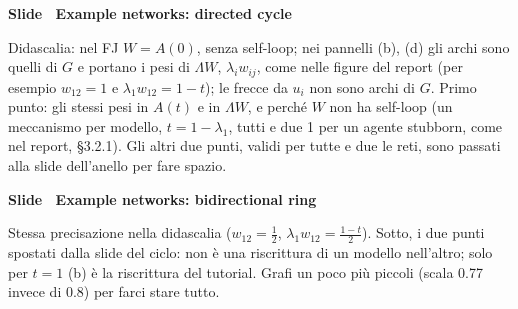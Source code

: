 \par\addvspace{14pt}\noindent\begin{minipage}{\textwidth}
{\color{unipd}\bfseries Slide  \textperiodcentered\ Example networks: directed cycle}\par\smallskip
{\small Didascalia: nel FJ $W = A(0)$, senza self-loop; nei pannelli (b), (d) gli archi sono quelli di $G$ e portano i pesi di $\Lambda W$, $\lambda_i w_{ij}$, come nelle figure del report (per esempio $w_{12} = 1$ e $\lambda_1 w_{12} = 1 - t$); le frecce da $u_i$ non sono archi di $G$. Primo punto: gli stessi pesi in $A(t)$ e in $\Lambda W$, e perché $W$ non ha self-loop (un meccanismo per modello, $t = 1 - \lambda_1$, tutti e due 1 per un agente stubborn, come nel report, §3.2.1). Gli altri due punti, validi per tutte e due le reti, sono passati alla slide dell'anello per fare spazio.}\par\smallskip
\noindent\begin{minipage}[t]{0.36\textwidth}\par
{}\par\smallskip
\end{minipage}\hfill\begin{minipage}[t]{0.61\textwidth}\par
{}\par\smallskip
\end{minipage}\par
\end{minipage}\par
\par\addvspace{14pt}\noindent\begin{minipage}{\textwidth}
{\color{unipd}\bfseries Slide  \textperiodcentered\ Example networks: bidirectional ring}\par\smallskip
{\small Stessa precisazione nella didascalia ($w_{12} = \frac12$, $\lambda_1 w_{12} = \frac{1-t}{2}$). Sotto, i due punti spostati dalla slide del ciclo: non è una riscrittura di un modello nell'altro; solo per $t = 1$ (b) è la riscrittura del tutorial. Grafi un poco più piccoli (scala 0.77 invece di 0.8) per farci stare tutto.}\par\smallskip
\noindent\begin{minipage}[t]{0.36\textwidth}\par
{}\par\smallskip
\end{minipage}\hfill\begin{minipage}[t]{0.61\textwidth}\par
{}\par\smallskip
\end{minipage}\par
\end{minipage}\par
